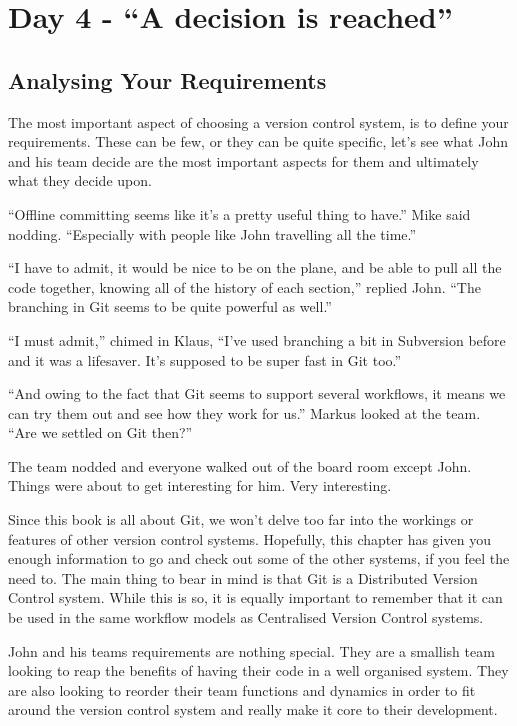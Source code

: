 \section{Day 4 - ``A decision is reached''}

\subsection{Analysing Your Requirements}

The most important aspect of choosing a version control system, is to define your requirements.  These can be few, or they can be quite specific, let's see what John and his team decide are the most important aspects for them and ultimately what they decide upon.

\begin{trenches}
``Offline committing seems like it's a pretty useful thing to have.''  Mike said nodding.  ``Especially with people like John travelling all the time.''

``I have to admit, it would be nice to be on the plane, and be able to pull all the code together, knowing all of the history of each section,'' replied John.  ``The branching in Git seems to be quite powerful as well.''

``I must admit,'' chimed in Klaus, ``I've used branching a bit in Subversion before and it was a lifesaver.  It's supposed to be super fast in Git too.''

``And owing to the fact that Git seems to support several workflows, it means we can try them out and see how they work for us.''  Markus looked at the team.  ``Are we settled on Git then?''

The team nodded and everyone walked out of the board room except John.  Things were about to get interesting for him.  Very interesting.
\end{trenches}

Since this book is all about Git, we won't delve too far into the workings or features of other version control systems.  Hopefully, this chapter has given you enough information to go and check out some of the other systems, if you feel the need to.  The main thing to bear in mind is that Git is a Distributed Version Control system.  While this is so, it is equally important to remember that it can be used in the same workflow models as Centralised Version Control systems.

John and his teams requirements are nothing special.  They are a smallish team looking to reap the benefits of having their code in a well organised system.  They are also looking to reorder their team functions and dynamics in order to fit around the version control system and really make it core to their development.  

